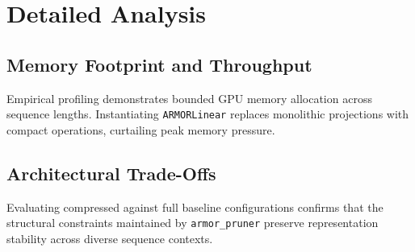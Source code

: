 \section{Detailed Analysis}

\subsection{Memory Footprint and Throughput}
Empirical profiling demonstrates bounded GPU memory allocation across sequence lengths. Instantiating \texttt{ARMORLinear} replaces monolithic projections with compact operations, curtailing peak memory pressure.

\subsection{Architectural Trade-Offs}
Evaluating compressed against full baseline configurations confirms that the structural constraints maintained by \texttt{armor_pruner} preserve representation stability across diverse sequence contexts.
